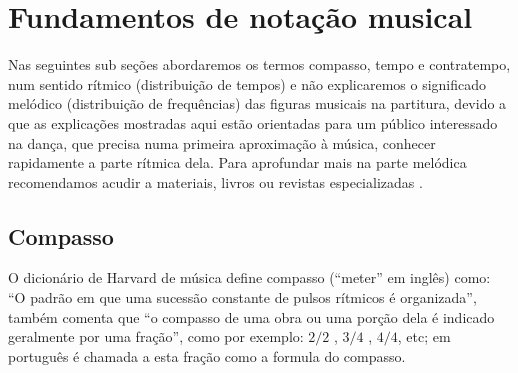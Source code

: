 
\chapter{Fundamentos de notação musical}
Nas seguintes sub seções abordaremos os termos compasso, tempo e contratempo,
num sentido rítmico (distribuição de tempos) e não explicaremos o significado 
melódico (distribuição de frequências) das 
figuras musicais na partitura, devido a que as explicações mostradas aqui estão
orientadas para um público interessado na dança, que precisa numa primeira 
aproximação à música, conhecer rapidamente a parte rítmica dela. Para aprofundar mais na parte 
melódica recomendamos acudir a materiais, livros ou revistas especializadas \cite{medteoria}
\cite{azevedocompor} \cite{alves2004teoria} \cite{mascarenhascurso} \cite{adolfo2002musica} \cite{grabner2001teoria}.
\section{Compasso}
\label{sec:compaso}

O dicionário de Harvard de música \cite{randel2003harvard} define compasso (``meter'' em inglês)
como: ``O padrão em que uma sucessão constante de pulsos rítmicos é organizada'', também comenta que
``o compasso de uma obra ou uma porção dela é indicado geralmente por uma fração'', como por exemplo:
$2/2$ , $3/4$ , $4/4$, etc; em português é chamada a esta fração como a formula do compasso. 

